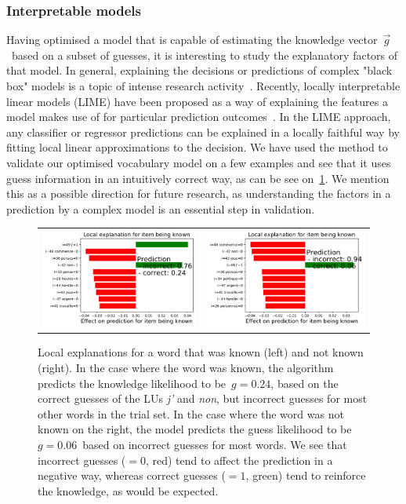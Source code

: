 \subsubsection{Interpretable models}
Having optimised a model that is capable of estimating the knowledge vector~$\vec{g}$~based on a subset of guesses, it is interesting to study the explanatory factors of that model. In general, explaining the decisions or predictions of complex "black box" models is a topic of intense research activity~\cite{2017arXiv170808296S}. Recently, locally interpretable linear models (LIME) have been proposed as a way of explaining the features a model makes use of for particular prediction outcomes~\cite{ribeiro2016should}. In the LIME approach, any classifier or regressor predictions can be explained in a locally faithful way by fitting local linear approximations to the decision. We have used the method to validate our optimised vocabulary model on a few examples and see that it uses guess information in an intuitively correct way, as can be see on~\cref{fig:lime}. We mention this as a possible direction for future research, as understanding the factors in a prediction by a complex model is an essential step in validation.

\begin{figure}[ht]
\label{fig:lime}
\centering
\begin{tabular}{cc}
\includegraphics[width=0.4\linewidth]{figures/lingvist/lime_pos.pdf} &
\includegraphics[width=0.4\linewidth]{figures/lingvist/lime_neg.pdf} \\
\end{tabular}
\caption[Local explanations of the model prediction]{Local explanations for a word that was known (left) and not known (right). In the case where the word was known, the algorithm predicts the knowledge likelihood to be~$g = 0.24$, based on the correct guesses of the LUs \textit{j'} and \textit{non}, but incorrect guesses for most other words in the trial set. In the case where the word was not known on the right, the model predicts the guess likelihood to be~$g = 0.06$~based on incorrect guesses for most words. We see that incorrect guesses ($=0$, red) tend to affect the prediction in a negative way, whereas correct guesses ($=1$, green) tend to reinforce the knowledge, as would be expected.}
\end{figure}


